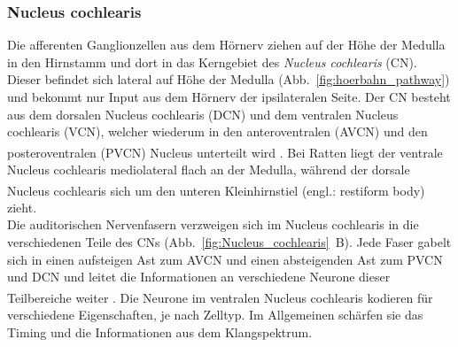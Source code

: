\documentclass[12pt,a4paper,pdftex]{article}
\begin{document}
\subsubsection*{Nucleus cochlearis}

Die afferenten Ganglionzellen aus dem Hörnerv ziehen auf der Höhe der Medulla in den Hirnstamm und dort in das Kerngebiet des \textit{Nucleus cochlearis} (CN).  Dieser befindet sich  lateral auf Höhe der Medulla (Abb.~\ref{fig:hoerbahn_pathway}) und bekommt nur Input aus dem Hörnerv der ipsilateralen Seite. Der CN besteht aus dem dorsalen Nucleus cochlearis (DCN) und dem ventralen Nucleus cochlearis (VCN), welcher wiederum in den anteroventralen (AVCN) und den posteroventralen (PVCN) Nucleus unterteilt wird \textsuperscript{\cite[22]{paxinos2014rat}}. Bei Ratten liegt der ventrale Nucleus cochlearis mediolateral flach an der Medulla, während der dorsale Nucleus cochlearis sich um den unteren Kleinhirnstiel (engl.: restiform body) \textsuperscript{\cite[22]{paxinos2014rat}} zieht.
\\ \noindent Die auditorischen Nervenfasern verzweigen sich im Nucleus cochlearis in die verschiedenen Teile des CNs (Abb.~\ref{fig:Nucleus_cochlearis}~B). Jede Faser gabelt sich in einen aufsteigen Ast zum AVCN und einen absteigenden Ast zum PVCN und DCN und leitet die Informationen an verschiedene Neurone dieser Teilbereiche weiter \textsuperscript{\cite[22]{paxinos2014rat}}. Die Neurone im ventralen Nucleus cochlearis kodieren für verschiedene Eigenschaften, je nach Zelltyp. Im Allgemeinen schärfen sie das Timing und die Informationen aus dem Klangspektrum. 
\\
\end{document}
